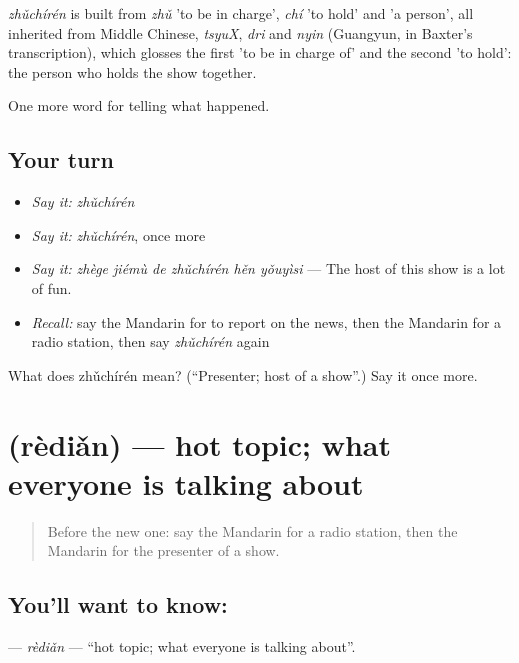 \begin{cousinweb}
\emph{zhǔchírén} is built from \emph{zhǔ} 'to be in charge', \emph{chí} 'to hold' and  'a person', all inherited from Middle Chinese, \emph{tsyuX}, \emph{dri} and \emph{nyin} (Guangyun, in Baxter's transcription), which glosses the first 'to be in charge of' and the second 'to hold': the person who holds the show together.
\end{cousinweb}

\begin{grammarlens}[title={What you've built}]
One more word for telling what happened.
\end{grammarlens}

\subsection*{Your turn}
\begin{itemize}
\raggedright
  \item \emph{Say it:} \emph{zhǔchírén}
  \item \emph{Say it:} \emph{zhǔchírén}, once more
  \item \emph{Say it:} \emph{zhège jiémù de zhǔchírén hěn yǒuyìsi} — The host of this show is a lot of fun.
  \item \emph{Recall:} say the Mandarin for to report on the news, then the Mandarin for a radio station, then say \emph{zhǔchírén} again
\end{itemize}

\begin{tcolorbox}[breakable,colback=teal!4,colframe=teal!35!black,title={Before you move on}]
What does zhǔchírén mean? (\textquotedblleft{}Presenter; host of a show\textquotedblright{}.) Say it once more.
\end{tcolorbox}
\section[\texorpdfstring{\zh{热点} (rèdiǎn)}{热点 (rèdiǎn)}]{ (rèdiǎn) — hot topic; what everyone is talking about}

\label{lesson:ZH-C290-redian}



\begin{quote}
Before the new one: say the Mandarin for a radio station, then the Mandarin for the presenter of a show.
\end{quote}

\subsection*{You'll want to know: }
\textbf{} — \emph{rèdiǎn} — \textquotedblleft{}hot topic; what everyone is talking about\textquotedblright{}.

